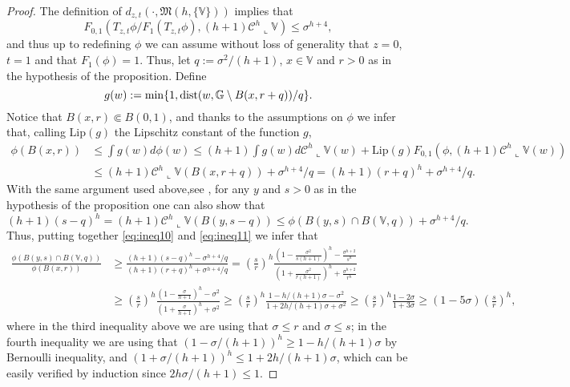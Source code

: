 \documentclass[10pt, a4paper,
oneside, headinclude,footinclude]{scrartcl}
\begin{document}
\begin{proof}
The definition of $d_{z,t}(\cdot,\mathfrak{M}(h,\{\mathbb{V}\}))$ implies that
$$F_{0,1}(T_{z,t}\phi/F_1(T_{z,t}\phi),(h+1)\mathcal{C}^h\llcorner \mathbb{V})\leq \sigma^{h+4},$$
and thus up to redefining $\phi$ we can assume without loss of generality that $z=0$, $t=1$ and that $F_1(\phi)=1$.
Thus, let $q:=\sigma^2/(h+1)$, $x\in \mathbb{V}$ and $r>0$ as in the hypothesis of the proposition. Define $$g(w):=\min\{1,\operatorname*{dist}(w,\mathbb{G}\setminus B(x,r+q))/q\}.$$
Notice that $B(x,r)\Subset B(0,1)$, and thanks to the assumptions on $\phi$ we infer that, calling $\mathrm{Lip}(g)$ the Lipschitz constant of the function $g$,
\begin{equation}
\begin{split}
     \phi(B(x,r))&\leq \int g(w)d\phi(w)
     \leq(h+1)\int g(w) d\mathcal{C}^h\llcorner \mathbb{V}(w)+\text{Lip}(g)F_{0,1}(\phi,(h+1)\mathcal{C}^h\llcorner \mathbb{V}(w))\\
     &\leq(h+1)\mathcal{C}^h\llcorner \mathbb{V}(B(x,r+q))+\sigma^{h+4}/q=(h+1)(r+q)^h+\sigma^{h+4}/q.
     \label{eq:ineq10}
\end{split}
\end{equation}
With the same argument used above,see \cite[Equation (37)]{antonelli2020rectifiable}, for any $y$ and $s>0$ as in the hypothesis of the proposition one can also show that
\begin{equation}
    (h+1)(s-q)^h=(h+1)\mathcal{C}^h\llcorner \mathbb{V}(B(y,s-q))\leq \phi(B(y,s)\cap B(\mathbb{V},q))+\sigma^{h+4}/q.
    \label{eq:ineq11}
\end{equation}
Thus, putting together \eqref{eq:ineq10} and \eqref{eq:ineq11} we infer that
\begin{equation}
    \begin{split}
        \frac{\phi(B(y,s)\cap B(\mathbb{V},q))}{\phi(B(x,r))}&\geq \frac{(h+1)(s-q)^h-\sigma^{h+4}/q}{(h+1)(r+q)^h+\sigma^{h+4}/q}=\left(\frac{s}{r}\right)^h\frac{\left(1-\frac{\sigma^2}{s(h+1)}\right)^h-\frac{\sigma^{h+2}}{s^h}}{\left(1+\frac{\sigma^2}{r(h+1)}\right)^h+\frac{\sigma^{h+2}}{r^h}} \\
        &\geq \left(\frac{s}{r}\right)^h
       \frac{\left(1-\frac{\sigma}{h+1}\right)^h-\sigma^2}{\left(1+\frac{\sigma}{h+1}\right)^h+\sigma^2}\geq \left(\frac{s}{r}\right)^h\frac{1-h/(h+1)\sigma-\sigma^2}{1+2h/(h+1)\sigma+\sigma^2} \geq \left(\frac{s}{r}\right)^h\frac{1-2\sigma}{1+3\sigma}\geq (1-5\sigma)\left(\frac{s}{r}\right)^h
       ,
        \nonumber
    \end{split}
\end{equation}
where in the third inequality above we are using that $\sigma\leq r$ and $\sigma\leq s$; in the fourth inequality we are using that $(1-\sigma/(h+1))^h\geq 1-h/(h+1)\sigma$ by Bernoulli inequality, and $(1+\sigma/(h+1))^h\leq 1+2h/(h+1)\sigma$, which can be easily verified by induction since $2h\sigma/(h+1)\leq 1$.
\end{proof}
\end{document}
